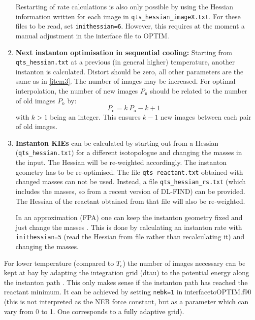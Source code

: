 \documentclass[12pt,a4paper,dvips]{article}
\begin{document}
\begin{enumerate}
  Restarting of rate calculations is also only possible by using the
  Hessian information written for each image in
  \texttt{qts\_hessian\_imageX.txt}. For these files to be read, set
  \texttt{inithessian=6}. However, this requires at the moment a manual adjustment in the interface file to OPTIM.

\item \textbf{Next instanton optimisation in sequential cooling:} Starting from
  \texttt{qts\_hessian.txt} at a previous (in general higher) temperature,
  another instanton is calculated. Distort should be zero, all other
  parameters are the same as in \ref{item3}. The number of images may be
  increased. For optimal interpolation, the number of new images
  $P_\mathrm{n}$ should be related to the number of old images $P_\mathrm{o}$
  by:
  \begin{equation}
    P_\mathrm{n}=k\ P_\mathrm{o} - k + 1
  \end{equation}
  with $k>1$ being an integer. This ensures $k-1$ new images between each pair
  of old images.

\item \textbf{Instanton KIEs} can be calculated by starting out from a Hessian
  (\texttt{qts\_hessian.txt}) for a different isotopologue and
  changing the masses in the input. The Hessian will be re-weighted
  accordingly. The instanton geometry has to be re-optimised. The file
  \texttt{qts\_reactant.txt} obtained with
  changed masses can not be used. Instead, a file
  \texttt{qts\_hessian\_rs.txt} (which includes the masses, so from a
  recent version of DL-FIND) can be provided. The Hessian of the
  reactant obtained from that file will also be re-weighted.

  In an approximation (FPA) one can keep the instanton geometry fixed
  and just change the masses \cite{Meissner2011}. This is done by calculating an instanton
  rate with \texttt{inithessian=5} (read the Hessian from file rather
  than recalculating it) and changing the masses.
\end{enumerate}

For lower temperature (compared to $T_\mathrm{c}$) the number of
images necessary can be kept at bay by adapting the integration grid
(dtau) to the potential energy along the instanton path \cite{Rommel2011b}. This only
makes sense if the instanton path has reached the reactant minimum. It
can be achieved by setting \texttt{nebk=1} in interfacetoOPTIM.f90 (this is not interpreted as
the NEB force constant, but as a parameter which can vary from 0 to
1. One corresponds to a fully adaptive grid).
\end{document}
